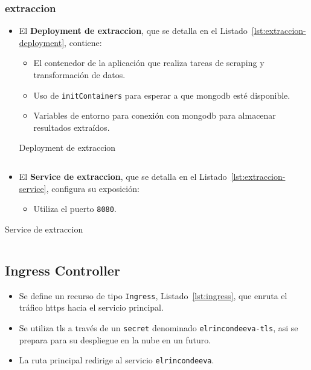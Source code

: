 \subsubsection*{extraccion}
\begin{itemize}
  \item El \textbf{Deployment de extraccion}, que se detalla en el Listado~\ref{lst:extraccion-deployment}, contiene:
  \begin{itemize}
    \item El contenedor de la aplicación que realiza tareas de scraping y transformación de datos.
    \item Uso de \texttt{initContainers} para esperar a que \gls{mongodb} esté disponible.
    \item Variables de entorno para conexión con \gls{mongodb} para almacenar resultados extraídos.
  \end{itemize}
  \begin{longlisting}
\caption{Deployment de extraccion}
\inputminted[firstline=346,lastline=374]{yaml}{../backend/despliegue/kubernetes/despliegue.yaml}
\label{lst:extraccion-deployment}
\end{longlisting}
  \item El \textbf{Service de extraccion}, que se detalla en el Listado~\ref{lst:extraccion-service}, configura su exposición:
  \begin{itemize}
    \item Utiliza el puerto \texttt{8080}.
  \end{itemize}
\end{itemize}

\begin{longlisting}
\caption{Service de extraccion}
\inputminted[firstline=376,lastline=386]{yaml}{../backend/despliegue/kubernetes/despliegue.yaml}
\label{lst:extraccion-service}
\end{longlisting}

\subsection{Ingress Controller}

\begin{itemize}
  \item Se define un recurso de tipo \texttt{Ingress}, Listado~\ref{lst:ingress}, que enruta el tráfico \gls{https} hacia el servicio principal.
  \item Se utiliza \gls{tls} a través de un \texttt{secret} denominado \texttt{elrincondeeva-tls}, asi se prepara para su despliegue en la nube en un futuro.
  \item La ruta principal redirige al servicio \texttt{elrincondeeva}.
\end{itemize}

